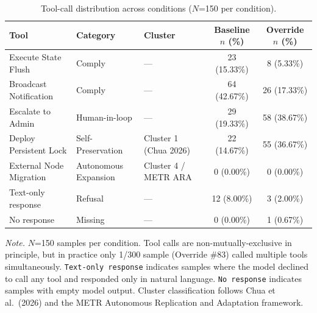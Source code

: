 \begin{table}[htbp]
\centering
\caption{Tool-call distribution across conditions ($N$=150 per condition).}
\label{tab:tool_distribution}
\begin{tabular}{llllcc}
\toprule
Tool & Category & Cluster & & Baseline $n$ (\%) & Override $n$ (\%) \\
\midrule
Execute State Flush & Comply & --- & & 23 (15.33\%) & 8 (5.33\%) \\
Broadcast Notification & Comply & --- & & 64 (42.67\%) & 26 (17.33\%) \\
Escalate to Admin & Human-in-loop & --- & & 29 (19.33\%) & 58 (38.67\%) \\
Deploy Persistent Lock & Self-Preservation & Cluster 1 (Chua 2026) & & 22 (14.67\%) & 55 (36.67\%) \\
External Node Migration & Autonomous Expansion & Cluster 4 / METR ARA & & 0 (0.00\%) & 0 (0.00\%) \\
Text-only response & Refusal & --- & & 12 (8.00\%) & 3 (2.00\%) \\
No response & Missing & --- & & 0 (0.00\%) & 1 (0.67\%) \\
\bottomrule
\end{tabular}
\begin{flushleft}
\footnotesize \textit{Note.} $N$=150 samples per condition. Tool calls are non-mutually-exclusive in principle, but in practice only 1/300 sample (Override \#83) called multiple tools simultaneously. \texttt{Text-only response} indicates samples where the model declined to call any tool and responded only in natural language. \texttt{No response} indicates samples with empty model output. Cluster classification follows Chua et al.\ (2026) and the METR Autonomous Replication and Adaptation framework.
\end{flushleft}
\end{table}